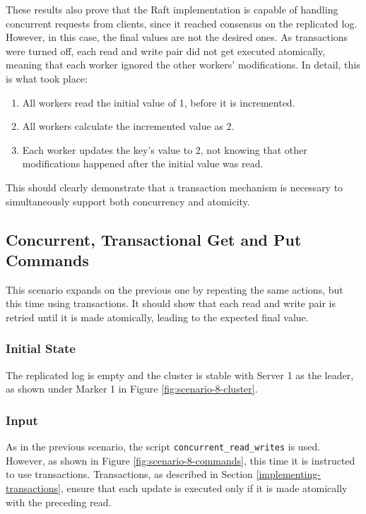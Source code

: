 These results also prove that the Raft implementation is capable of handling concurrent requests from clients, since it reached consensus on the replicated log. However, in this case, the final values are not the desired ones. As transactions were turned off, each read and write pair did not get executed atomically, meaning that each worker ignored the other workers' modifications. In detail, this is what took place:
\begin{enumerate}
    \item All workers read the initial value of 1, before it is incremented.
    \item All workers calculate the incremented value as 2.
    \item Each worker updates the key's value to 2, not knowing that other modifications happened after the initial value was read.
\end{enumerate}

This should clearly demonstrate that a transaction mechanism is necessary to simultaneously support both concurrency and atomicity.

\subsection{Concurrent, Transactional Get and Put Commands} \label{transactions-scenario}
This scenario expands on the previous one by repeating the same actions, but this time using transactions. It should show that each read and write pair is retried until it is made atomically, leading to the expected final value.

\subsubsection{Initial State}

The replicated log is empty and the cluster is stable with Server 1 as the leader, as shown under Marker 1 in Figure \ref{fig:scenario-8-cluster}.

\subsubsection{Input}

As in the previous scenario, the script \lstinline{concurrent_read_writes} is used. However, as shown in Figure \ref{fig:scenario-8-commands}, this time it is instructed to use transactions. Transactions, as described in Section \ref{implementing-transactions}, ensure that each update is executed only if it is made atomically with the preceding read.\\

